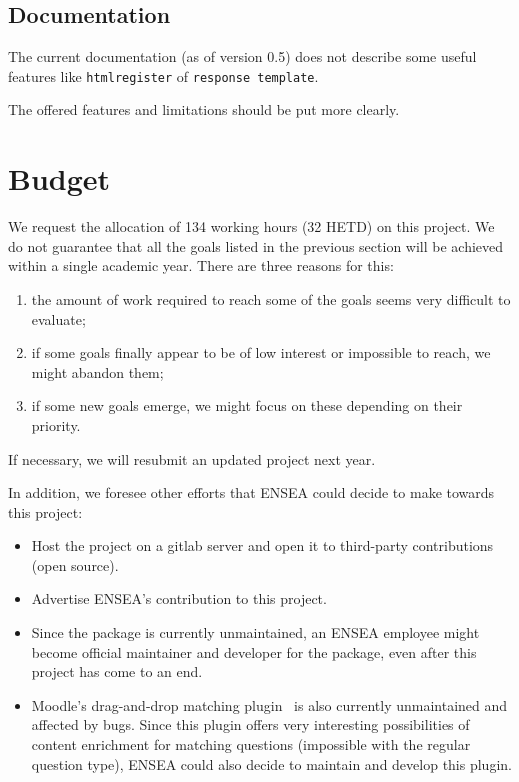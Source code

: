 \documentclass[twocolumn,a4paper,9pt]{article}
\begin{document}
\subsection{Documentation}

The current documentation (as of version 0.5) does not describe some useful 
features like \texttt{htmlregister} of \texttt{response template}.

The offered features and limitations should be put more clearly.

\section{Budget}

We request the allocation of 134 working hours (32 HETD) on this project. 
We do not guarantee that all the goals listed in the previous section will be 
achieved within a single academic year. There are three reasons for this:
\begin{enumerate}
	\item the amount of work required to reach some of the goals seems very 
	difficult to evaluate;
	\item if some goals finally appear to be of low interest or impossible to 
	reach, we might abandon them;
	\item if some new goals emerge, we might focus on these depending on their 
	priority.
\end{enumerate}
If necessary, we will resubmit an updated project next year.

In addition, we foresee other efforts that ENSEA could decide to make towards 
this project:
\begin{itemize}
\item Host the project on a gitlab server and open it to third-party 
contributions (open source).
\item Advertise ENSEA's contribution to this project.
\item Since the package is currently unmaintained, an ENSEA employee might 
become official maintainer and developer for the package, even after this 
project has come to an end.
\item Moodle's drag-and-drop matching plugin~\cite{ddmatch} is also currently 
unmaintained and affected by bugs. Since this plugin offers very interesting 
possibilities of content enrichment for matching questions (impossible with the 
regular question type), ENSEA could also decide to maintain and develop this 
plugin.
\end{itemize}
\end{document}

